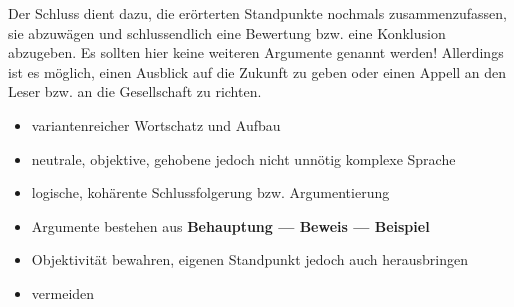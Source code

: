 \begin{enumerate}
\begin{itemize}
	\end{itemize}


	Der Schluss dient dazu, die er\"{o}rterten Standpunkte nochmals zusammenzufassen, sie abzuw\"{a}gen und schlussendlich eine Bewertung bzw. eine Konklusion abzugeben. Es sollten hier keine weiteren Argumente genannt werden! Allerdings ist es m\"{o}glich, einen Ausblick auf die Zukunft zu geben oder einen Appell an den Leser bzw. an die Gesellschaft zu richten.

\end{enumerate}


\begin{itemize}
	\item variantenreicher Wortschatz und Aufbau

	\item neutrale, objektive, gehobene jedoch nicht unn\"{o}tig komplexe Sprache

	\item logische, koh\"{a}rente Schlussfolgerung bzw. Argumentierung

	\item Argumente bestehen aus \textbf{Behauptung --- Beweis --- Beispiel}

	\item Objektivit\"{a}t bewahren, eigenen Standpunkt jedoch auch herausbringen

	\item {} vermeiden
\end{itemize}

